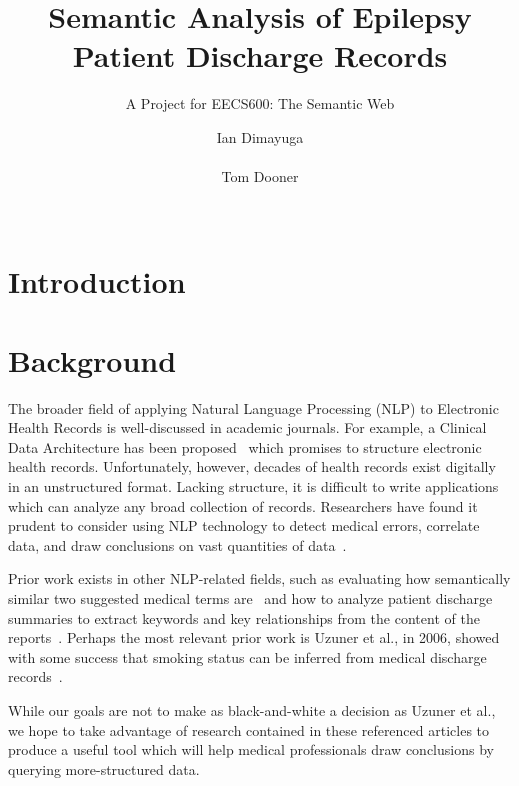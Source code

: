 \documentclass{acm_proc_article-sp}
\begin{document}
\title{Semantic Analysis of Epilepsy Patient Discharge Records}
\subtitle{A Project for EECS600: The Semantic Web}
\author{
\alignauthor Ian Dimayuga \\
    \\
\alignauthor Tom Dooner \\
    \\
}
\maketitle
\begin{abstract}
\end{abstract}

\section{Introduction}

\section{Background}
The broader field of applying Natural Language Processing (NLP) to Electronic Health Records
is well-discussed in academic journals. For example, a Clinical Data Architecture has been
proposed~\cite{CDA} which promises to structure electronic health records. Unfortunately, however,
decades of health records exist digitally in an unstructured format. Lacking structure, it is
difficult to write applications which can analyze any broad collection of records. Researchers
have found it prudent to consider using NLP technology to detect medical errors, correlate data, 
and draw conclusions on vast quantities of data~\cite{friedman}.

Prior work exists in other NLP-related fields, such as evaluating how semantically similar 
two suggested medical terms are~\cite{Pedersen2007288} and how to analyze patient
discharge summaries to extract keywords and key relationships from the content of the
reports~\cite{soderland}. Perhaps the most relevant prior work is Uzuner et al., in 2006,
showed with some success that smoking status can be inferred from medical discharge 
records~\cite{Uzuner200814}.

While our goals are not to make as black-and-white a decision as Uzuner et al., we hope to take 
advantage of research contained in these referenced articles to produce a useful tool which will
help medical professionals draw conclusions by querying more-structured data.
\end{document}
